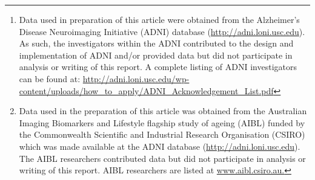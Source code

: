 \documentclass[10pt,journal,compsoc]{IEEEtran}
\begin{document}
\author{Clément Chadebec,
Elina Thibeau-Sutre,
Ninon Burgos,
and~Stéphanie~Allassonnière,
for the Alzheimer’s Disease Neuroimaging Initiative, and the Australian Imaging Biomarkers and Lifestyle flagship study of ageing


\thanks{Data used in preparation of this article were obtained from the Alzheimer’s Disease Neuroimaging Initiative (ADNI) database (\url{http://adni.loni.usc.edu}). As such, the investigators within the ADNI contributed to  the design and implementation of ADNI and/or provided data but did not participate in analysis or writing of this report. A complete listing of ADNI investigators can be found at: \url{http://adni.loni.usc.edu/wp-content/uploads/how_to_apply/ADNI_Acknowledgement_List.pdf}}

\thanks{Data used in the preparation of this article was obtained from the Australian Imaging Biomarkers and Lifestyle flagship study of ageing (AIBL) funded by the Commonwealth Scientific and Industrial Research Organisation (CSIRO) which was made available at the ADNI database (\url{http://adni.loni.usc.edu}). The AIBL researchers contributed data but did not participate in analysis or writing of this report. AIBL researchers are listed at \url{www.aibl.csiro.au.}}


}
\end{document}
